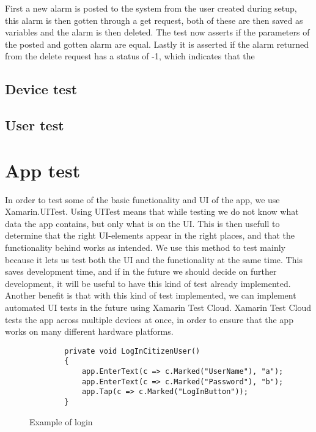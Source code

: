 First a new alarm is posted to the system from the user created during setup, this alarm is then gotten through a get request, both of these are then saved as variables and the alarm is then deleted. The test now asserts if the parameters of the posted and gotten alarm are equal. Lastly it is asserted if the alarm returned from the delete request has a status of -1, which indicates that the 

\subsection{Device test}


\subsection{User test}



\section{App test}
In order to test some of the basic functionality and UI of the app, we use Xamarin.UITest. Using UITest means that while testing we do not know what data the app contains, but only what is on the UI. This is then usefull to determine that the right UI-elements appear in the right places, and that the functionality behind works as intended. We use this method to test mainly because it lets us test both the UI and the functionality at the same time. This saves development time, and if in the future we should decide on further development, it will be useful to have this kind of test already implemented.
Another benefit is that with this kind of test implemented, we can implement automated UI tests in the future using Xamarin Test Cloud. Xamarin Test Cloud tests the app across multiple devices at once, in order to ensure that the app works on many different hardware platforms. 

\begin{figure}[H]
    \centering
    \begin{lstlisting}
        private void LogInCitizenUser()
        {
            app.EnterText(c => c.Marked("UserName"), "a");
            app.EnterText(c => c.Marked("Password"), "b");
            app.Tap(c => c.Marked("LogInButton"));
        }
        \end{lstlisting}
    \caption{Example of login}
    \label{fig:test:loginFunction}
\end{figure}

